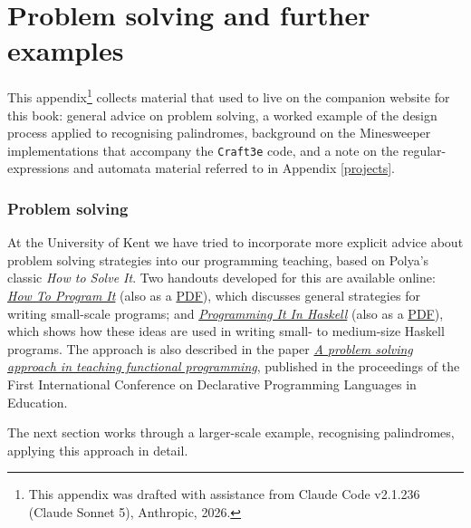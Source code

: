 

\chapter{Problem solving and further examples}
\label{further}
\normalfont\normalsize

This appendix\footnote{This appendix was drafted with assistance from Claude Code v2.1.236 (Claude Sonnet 5), Anthropic, 2026.} collects material that used to live on the companion website for this book: general advice on problem solving, a worked example of the design process applied to recognising palindromes, background on the Minesweeper implementations that accompany the \texttt{Craft3e} code, and a note on the regular-expressions and automata material referred to in Appendix \ref{projects}.

\subsection*{Problem solving}
\label{ProbSolving}

At the University of Kent we have tried to incorporate more explicit advice about problem solving strategies into our programming teaching, based on Polya's classic \emph{How to Solve It}. Two handouts developed for this are available online: \href{http://www.cs.kent.ac.uk/people/staff/sjt/Haskell_craft/HowToProgIt.html}{\emph{How To Program It}} (also as a \href{http://www.cs.kent.ac.uk/people/staff/sjt/Haskell_craft/howToProgIt.pdf}{PDF}), which discusses general strategies for writing small-scale programs; and \href{http://www.cs.kent.ac.uk/people/staff/sjt/Haskell_craft/ProgInHaskell.html}{\emph{Programming It In Haskell}} (also as a \href{http://www.cs.kent.ac.uk/people/staff/sjt/Haskell_craft/progInHaskell.pdf}{PDF}), which shows how these ideas are used in writing small- to medium-size Haskell programs. The approach is also described in the paper \href{https://link.springer.com/chapter/10.1007/BFb0033853}{\emph{A problem solving approach in teaching functional programming}}, published in the proceedings of the First International Conference on Declarative Programming Languages in Education.

The next section works through a larger-scale example, recognising palindromes, applying this approach in detail.

